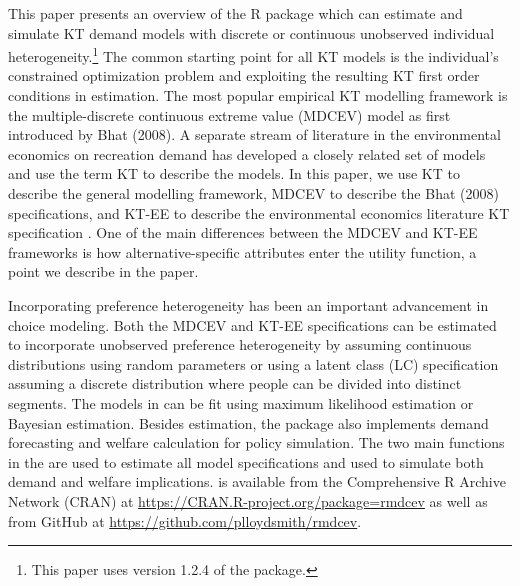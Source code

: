 This paper presents an overview of the R package  which
can estimate and simulate KT demand models with discrete or continuous
unobserved individual heterogeneity.\footnote{This paper uses version
  1.2.4 of the  package.} The common starting point for all
KT models is the individual's constrained optimization problem and
exploiting the resulting KT first order conditions in estimation. The
most popular empirical KT modelling framework is the multiple-discrete
continuous extreme value (MDCEV) model as first introduced by Bhat
(2008). A separate stream of literature in the environmental economics
on recreation demand has developed a closely related set of models and
use the term KT to describe the models. In this paper, we use KT to
describe the general modelling framework, MDCEV to describe the Bhat
(2008) specifications, and KT-EE to describe the environmental economics
literature KT specification \citep{vonhaefenestimation2004}. One of the
main differences between the MDCEV and KT-EE frameworks is how
alternative-specific attributes enter the utility function, a point we
describe in the paper.

Incorporating preference heterogeneity has been an important advancement
in choice modeling. Both the MDCEV and KT-EE specifications can be
estimated to incorporate unobserved preference heterogeneity by assuming
continuous distributions using random parameters or using a latent class
(LC) specification assuming a discrete distribution where people can be
divided into distinct segments. The models in  can be fit
using maximum likelihood estimation or Bayesian estimation. Besides
estimation, the  package also implements demand forecasting
and welfare calculation for policy simulation. The two main functions in
the  are  used to estimate all model
specifications and  used to simulate both demand and
welfare implications.  is available from the Comprehensive R
Archive Network (CRAN) at
\url{https://CRAN.R-project.org/package=rmdcev} as well as from GitHub
at \url{https://github.com/plloydsmith/rmdcev}.


